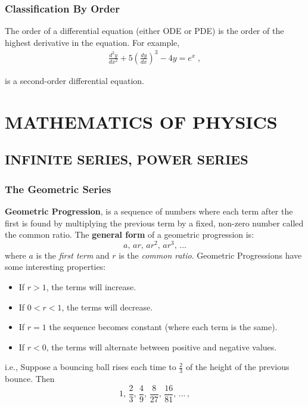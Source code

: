 \documentclass[12pt]{report}
\begin{document}
        \section{Classification By Order}

        \par The order of a differential equation (either ODE or PDE) is the order of the highest derivative in the equation. For example,
        \begin{align*}
            \frac{d^{2}y}{dx^{2}} + 5 \left( \frac{dy}{dx} \right)^3 - 4y = e^{x} \; ,
        \end{align*}
        \par is a second-order differential equation.
    
	
	\part{MATHEMATICS OF PHYSICS}
	
	\chapter{INFINITE SERIES, POWER SERIES}
	
	\section{The Geometric Series\cite{MaryBoas-MathofPhysics-2006}}
	
	\par \textbf{Geometric Progression}, is a sequence of numbers where each term after the first is found by multiplying the previous term by a fixed, non-zero number called the common ratio. The \textbf{general form} of a geometric progression is:
	\begin{equation}\label{eq:GP_general-form-1}
		a, \, ar, \, ar^{2}, \, ar^{3}, \, ...
	\end{equation}
	where $a$ is the \textit{first term} and $r$ is the \textit{common ratio}. Geometric Progressions have some interesting properties:
	\begin{itemize}
		\item If $r > 1$, the terms will increase.
		\item If $0 < r < 1$, the terms will decrease.
		\item If $r = 1$ the sequence becomes constant (where each term is the same).
		\item If $r < 0$, the terms will alternate between positive and negative values.
	\end{itemize} 
	i.e., Suppose a bouncing ball rises each time to $\frac{2}{3}$ of the height of the previous bounce. Then	
	\begin{equation}\label{BounceBall-ie1}
		1, \, \frac{2}{3}, \, \frac{4}{9}, \, \frac{8}{27}, \, \frac{16}{81}, \, ... \, ,
	\end{equation}
	
\end{document}
